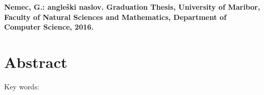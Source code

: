 \textbf{Nemec, G.: angleški naslov. Graduation Thesis, University of
  Maribor, Faculty of Natural Sciences and Mathematics, Department of
  Computer Science, 2016.}

\section*{Abstract}
\label{sec:abstract}


Key words: 


